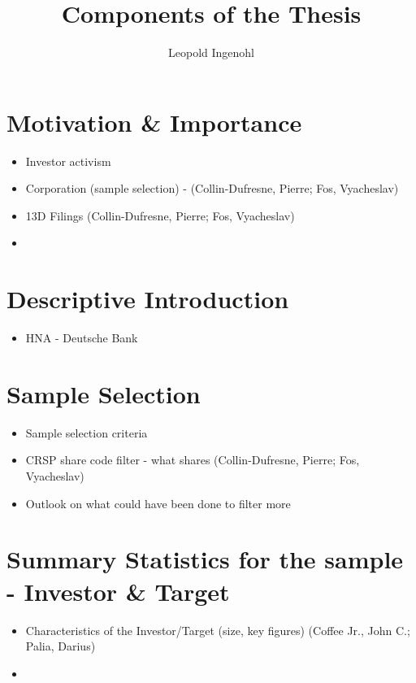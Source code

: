 \documentclass[12pt]{article}
\title{Components of the Thesis}
\author{Leopold Ingenohl}
\begin{document}
\maketitle


\section{Motivation \& Importance} 

    \begin{itemize}
        \item Investor activism 
        \item Corporation (sample selection) - (Collin-Dufresne, Pierre; Fos, Vyacheslav)
        \item 13D Filings (Collin-Dufresne, Pierre; Fos, Vyacheslav)
        \item 
    \end{itemize}

\section{Descriptive Introduction}

    \begin{itemize}
        \item HNA - Deutsche Bank
    \end{itemize}

\section{Sample Selection}

    \begin{itemize}
        \item Sample selection criteria
        \item CRSP share code filter - what shares (Collin-Dufresne, Pierre; Fos, Vyacheslav)
        \item Outlook on what could have been done to filter more 
    \end{itemize}

\section{Summary Statistics for the sample - Investor \& Target}

\begin{itemize}
    \item Characteristics of the Investor/Target (size, key figures) (Coffee Jr., John C.; Palia, Darius)
    \item 
\end{itemize}
\end{document}
